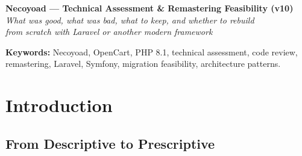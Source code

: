 \documentclass[11pt,a4paper]{article}
\begin{document}
\thispagestyle{empty}
\begin{center}
{\Large\bfseries Necoyoad --- Technical Assessment \& Remastering Feasibility (v10)}\\[0.4em]
{\small\itshape What was good, what was bad, what to keep, and whether to rebuild\\
from scratch with Laravel or another modern framework}\\[1.2em]
\end{center}

\begin{abstract}
\noindent
This is the tenth and final volume of the Necoyoad architecture blueprint.
Unlike volumes v1--v9 (which were strictly descriptive), v10 is
\textbf{prescriptive}: it evaluates the codebase, identifies what was well
designed, what was poorly designed, what is worth preserving in a remastering
effort, and assesses the feasibility of rebuilding the platform from scratch
using Laravel (or a similar modern PHP framework).

The assessment is based on the exhaustive source-code analysis conducted
across v1--v9: 1,450 PHP files, 87 database tables, 202 pages of verified
architecture documentation. The findings are organised into four parts:
\textbf{Part I --- What Was Good} (10 architectural strengths worth
preserving); \textbf{Part II --- What Was Bad} (15 technical debts and
design flaws); \textbf{Part III --- What to Keep} (8 patterns and
abstractions that should survive a remastering); and \textbf{Part IV ---
Feasibility of a Laravel Rebuild} (a pattern-by-pattern mapping from
Necoyoad to Laravel, with effort estimates and a recommended migration
strategy).
\end{abstract}

\vspace{0.6em}
\noindent\textbf{Keywords:} Necoyoad, OpenCart, PHP 8.1, technical
assessment, code review, remastering, Laravel, Symfony, migration
feasibility, architecture patterns.

\newpage
\tableofcontents
\newpage

\section{Introduction}\label{sec:intro}

\subsection{From Descriptive to Prescriptive}
\end{document}
